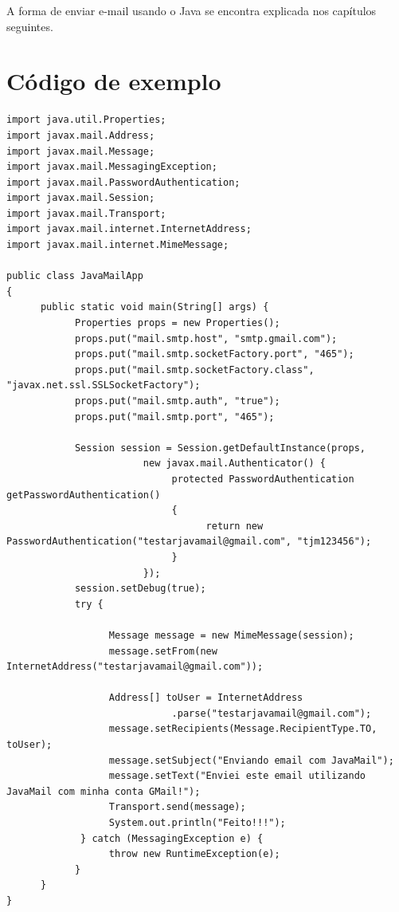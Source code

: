 \documentclass[14pt, a4paper]{article}
\begin{document}
A forma de enviar e-mail usando o Java se encontra explicada nos capítulos seguintes.

\section{Código de exemplo}%

\begin{lstlisting}
import java.util.Properties;
import javax.mail.Address;
import javax.mail.Message;
import javax.mail.MessagingException;
import javax.mail.PasswordAuthentication;
import javax.mail.Session;
import javax.mail.Transport;
import javax.mail.internet.InternetAddress;
import javax.mail.internet.MimeMessage;

public class JavaMailApp
{
      public static void main(String[] args) {
            Properties props = new Properties();
            props.put("mail.smtp.host", "smtp.gmail.com");
            props.put("mail.smtp.socketFactory.port", "465");
            props.put("mail.smtp.socketFactory.class", "javax.net.ssl.SSLSocketFactory");
            props.put("mail.smtp.auth", "true");
            props.put("mail.smtp.port", "465");

            Session session = Session.getDefaultInstance(props,
                        new javax.mail.Authenticator() {
                             protected PasswordAuthentication getPasswordAuthentication() 
                             {
                                   return new PasswordAuthentication("testarjavamail@gmail.com", "tjm123456");
                             }
                        });
            session.setDebug(true);
            try {

                  Message message = new MimeMessage(session);
                  message.setFrom(new InternetAddress("testarjavamail@gmail.com"));

                  Address[] toUser = InternetAddress
                             .parse("testarjavamail@gmail.com");  
                  message.setRecipients(Message.RecipientType.TO, toUser);
                  message.setSubject("Enviando email com JavaMail");
                  message.setText("Enviei este email utilizando JavaMail com minha conta GMail!");
                  Transport.send(message);
                  System.out.println("Feito!!!");
             } catch (MessagingException e) {
                  throw new RuntimeException(e);
            }
      }
}
\end{lstlisting}
\end{document}
